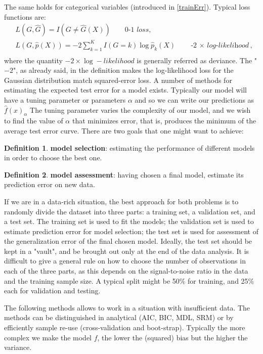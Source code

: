 \documentclass[12pt, letterpaper]{article}
\theoremstyle{definition}
\newtheorem{definition}{Definition}[section]
\begin{document}
The same holds for categorical variables (introduced in \autoref{trainErr}). Typical loss functions are:
\begin{equation}
\begin{aligned}
&L(G, \hat{G}) = I(G\ne\hat{G}(X)) \quad\quad \textit{0-1 loss},\\
&L(G, \hat{p}(X)) = -2\sum_{k=1}^K I(G=k)\log\hat{p}_k(X) \quad\quad \textit{-2 $\times$ log-likelihood},\\
\end{aligned}
\end{equation}
where the quantity $-2 \times \log-likelihood$ is generally referred as deviance. The "$-2$", as already said, in the definition makes the log-likelihood loss for the Gaussian distribution match squared-error loss.
A number of methods for estimating the expected test error for a model exists. Typically our model will have a tuning parameter or parameters $\alpha$ and so we can write our predictions as$ \hat{f}(x)_\alpha$
The tuning parameter varies the complexity of our model, and we wish to find the value of $\alpha$ that minimizes error, that is, produces the minimum of the average test error curve. There are two goals that one might want to achieve:
\begin{definition}{\textbf{model selection}}: estimating the performance of different models in order to choose the best one.
\end{definition}
\begin{definition}{\textbf{model assessment}}: having chosen a final model, estimate its prediction error on new data.
\end{definition}


If we are in a data-rich situation, the best approach for both problems is to randomly divide the dataset into three parts: a training set, a validation set, and a test set. The training set is used to fit the models; the validation set is used to estimate prediction error for model selection; the test set is used for assessment of the generalization error of the final chosen model. Ideally, the test set should be kept in a "vault", and be brought out only at the end of the data analysis. It is difficult to give a general rule on how to choose the number of observations in each of the three parts, as this depends on the signal-to-noise ratio in the data and the training sample size. A typical split might be 50\% for training, and 25\% each for validation and testing.

The following methods allows to work in a situation with insufficient data. The methods can be distinguished in analytical (AIC, BIC, MDL, SRM) or by efficiently sample re-use (cross-validation and boot-strap). 
Typically the more complex we make the model $f$, the lower the (squared) bias but the higher the variance.
\end{document}
